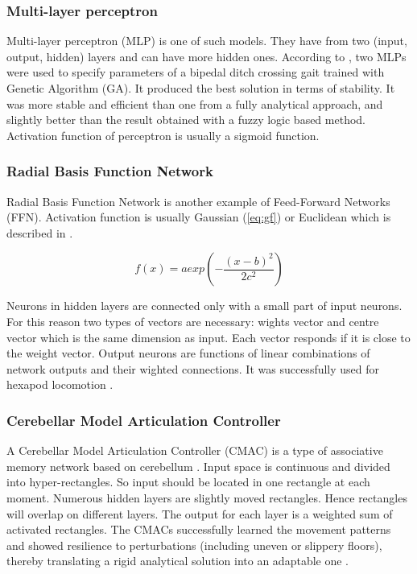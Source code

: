 \documentclass[12pt,a4paper]{report}
\begin{document}
				\subsubsection{Multi-layer perceptron}
					Multi-layer perceptron (MLP) is one of such models. They have from two (input, output, hidden) layers and can have more hidden ones. According to \cite{vundavilli2010dynamically}, two MLPs were used to specify parameters of a bipedal ditch crossing gait trained with Genetic Algorithm (GA). It produced the best solution in terms of stability. It was more stable and efficient than one from a fully analytical approach, and slightly better than the result obtained with a fuzzy logic based method. Activation function of perceptron is usually a sigmoid function.
				\subsubsection{Radial Basis Function Network}
					Radial Basis Function Network is another example of Feed-Forward Networks (FFN). Activation function is usually Gaussian (\ref{eq:gf}) or Euclidean which is described in \cite{EuclideanFunction}.
					
					\begin{equation}\label{eq:gf}
						f(x) = a exp \left(  - \dfrac{(x - b)^2}{2c^2} \right)
					\end{equation}
					
					Neurons in hidden layers are connected only with a small part of input neurons. For this reason two types of vectors are necessary: wights vector and centre vector which is the same dimension as input. Each vector responds if it is close to the weight vector. Output neurons are functions of linear combinations of network outputs and their wighted connections.
					It was successfully used for hexapod locomotion \cite{ilg1995learning}.
				\subsubsection{Cerebellar Model Articulation Controller}
					A Cerebellar Model Articulation Controller (CMAC) is a type of associative memory network based on cerebellum \cite{albus1975new}. Input space is continuous and divided into hyper-rectangles. So input should be located in one rectangle at each moment. Numerous hidden layers are slightly moved rectangles. Hence rectangles will overlap on different layers. The output for each layer is a weighted sum of activated rectangles. The CMACs successfully learned the movement patterns and showed resilience to perturbations (including uneven or slippery floors), thereby translating a rigid analytical solution into an adaptable one \cite{sabourin2005robustness}.
\end{document}
